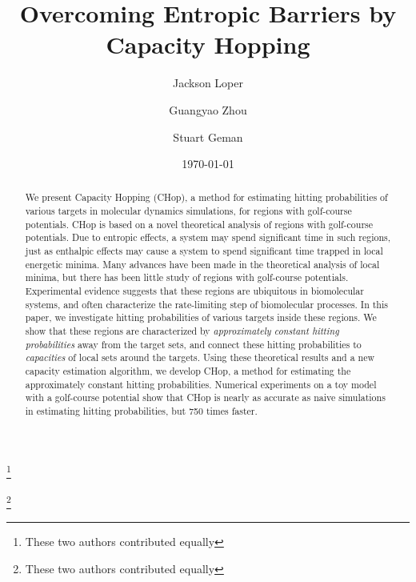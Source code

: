 \documentclass[english, aip, jcp, priprint, graphicx,floatfix]{revtex4-1}
\theoremstyle{plain}
\theoremstyle{definition}
\theoremstyle{plain}
\begin{document}
\title{Overcoming Entropic Barriers by Capacity Hopping} %

\author{Jackson Loper}
\thanks{These two authors contributed equally}

\author{Guangyao Zhou}
\thanks{These two authors contributed equally}

\author{Stuart Geman}

\date{\today}

\begin{abstract}
	We present Capacity Hopping (CHop), a method for estimating hitting probabilities of various targets in molecular dynamics simulations, for regions with golf-course potentials. CHop is based on a novel theoretical analysis of regions with golf-course potentials. Due to entropic effects, a system may spend significant time in such regions, just as enthalpic effects may cause a system to spend significant time trapped in local energetic minima. Many advances have been made in the theoretical analysis of local minima, but there has been little study of regions with golf-course potentials. Experimental evidence suggests that these regions are ubiquitous in biomolecular systems, and often characterize the rate-limiting step of biomolecular processes.  In this paper, we investigate hitting probabilities of various targets inside these regions. We show that these regions are characterized by \emph{approximately constant hitting probabilities} away from the target sets, and connect these hitting probabilities to \textit{capacities} of local sets around the targets.  Using these theoretical results and a new capacity estimation algorithm, we develop CHop, a method for estimating the approximately constant hitting probabilities. Numerical experiments on a toy model with a golf-course potential show that CHop is nearly as accurate as naive simulations in estimating hitting probabilities, but 750 times faster.
\end{abstract}

\pacs{}%

\maketitle %
\end{document}
